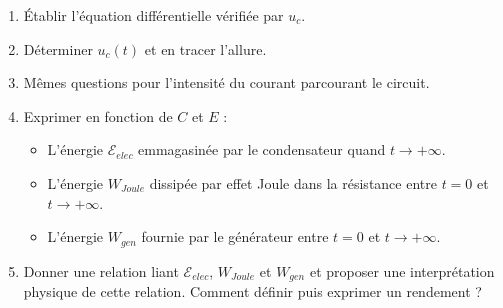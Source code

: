 \begin{enumerate}
	\item Établir l'équation différentielle vérifiée par $u_c$.
	\item Déterminer $u_c(t)$ et en tracer l'allure.
	\item Mêmes questions pour l'intensité du courant parcourant le circuit.
	\item Exprimer en fonction de $C$ et $E$ :
	\begin{itemize}
		\item L'énergie $\mathcal{E}_{elec}$ emmagasinée par le condensateur quand $t\rightarrow+\infty$.
		\item L'énergie $W_{Joule}$ dissipée par effet Joule dans la résistance entre $t=0$ et $t\rightarrow+\infty$.
		\item L'énergie $W_{gen}$ fournie par le générateur entre $t=0$ et $t\rightarrow+\infty$.
	\end{itemize}
	\item Donner une relation liant $\mathcal{E}_{elec}$, $W_{Joule}$ et $W_{gen}$ et proposer une interprétation physique de cette relation. Comment définir puis exprimer un rendement ?

\end{enumerate}